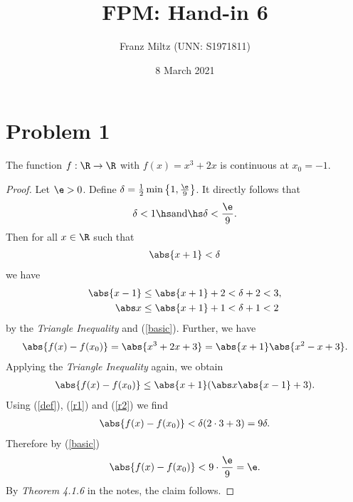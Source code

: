 \documentclass{article}
\begin{document}
\title{FPM: Hand-in 6}
\author{Franz Miltz (UNN: S1971811)}
\date{8 March 2021}
\maketitle
\mkthms

\section*{Problem 1}

\begin{claim*}
    The function $f:\R\to\R$ with $f(x) = x^3+2x$ is continuous at $x_0=-1$.
\end{claim*}
\begin{proof}
    Let $\e>0$. Define $\delta = \frac{1}{2}\min\left\lbrace1,\frac{\e}{9}\right\rbrace$. It directly follows that
    \begin{align}
        \label{basic}
        \delta< 1\hs\text{and}\hs \delta <\frac{\e}{9}.
    \end{align}
    Then for all $x\in\R$ such that
    \begin{align}
        \label{def}
        \abs{x+1}<\delta
    \end{align}
    we have
    \begin{align}
        \label{r1}
        \abs{x-1} & \leq \abs{x+1} + 2 < \delta + 2 < 3, \\
        \label{r2}
        \abs x    & \leq \abs{x+1}+1 < \delta + 1 < 2
    \end{align}
    by the \emph{Triangle Inequality} and (\ref{basic}). Further, we have
    \begin{align*}
        \abs{f(x)-f(x_0)}=\abs{x^3+2x+3}=\abs{x+1}\abs{x^2-x+3}.
    \end{align*}
    Applying the \emph{Triangle Inequality} again, we obtain
    \begin{align*}
        \abs{f(x)-f(x_0)}\leq \abs{x+1}(\abs x\abs{x-1}+3).
    \end{align*}
    Using (\ref{def}), (\ref{r1}) and (\ref{r2}) we find
    \begin{align*}
        \abs{f(x)-f(x_0)} < \delta (2\cdot 3 + 3) = 9\delta.
    \end{align*}
    Therefore by (\ref{basic})
    \begin{align*}
        \abs{f(x)-f(x_0)} < 9\cdot\frac{\e}{9}=\e.
    \end{align*}
    By \emph{Theorem 4.1.6} in the notes, the claim follows.
\end{proof}
\end{document}
